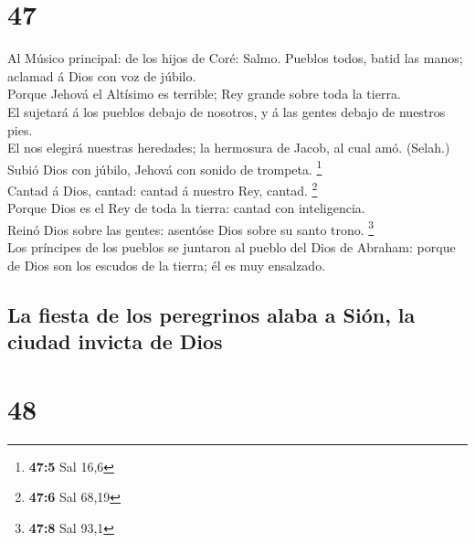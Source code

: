 \hypertarget{section-46}{%
\section{47}\label{section-46}}

 Al Músico principal: de los hijos de Coré: Salmo. Pueblos
todos, batid las manos; aclamad á Dios con voz de júbilo.\\
 Porque Jehová el Altísimo es terrible; Rey grande sobre
toda la tierra.\\
 El sujetará á los pueblos debajo de nosotros, y á las
gentes debajo de nuestros pies.\\
 El nos elegirá nuestras heredades; la hermosura de Jacob,
al cual amó. (Selah.)\\
 Subió Dios con júbilo, Jehová con sonido de trompeta.
\footnote{\textbf{47:5} Sal 16,6}\\
 Cantad á Dios, cantad: cantad á nuestro Rey, cantad.
\footnote{\textbf{47:6} Sal 68,19}\\
 Porque Dios es el Rey de toda la tierra: cantad con
inteligencia.\\
 Reinó Dios sobre las gentes: asentóse Dios sobre su santo
trono. \footnote{\textbf{47:8} Sal 93,1}\\
 Los príncipes de los pueblos se juntaron al pueblo del
Dios de Abraham: porque de Dios son los escudos de la tierra; él es muy
ensalzado.

\hypertarget{la-fiesta-de-los-peregrinos-alaba-a-siuxf3n-la-ciudad-invicta-de-dios}{%
\subsection{La fiesta de los peregrinos alaba a Sión, la ciudad invicta
de
Dios}\label{la-fiesta-de-los-peregrinos-alaba-a-siuxf3n-la-ciudad-invicta-de-dios}}

\hypertarget{section-47}{%
\section{48}\label{section-47}}

